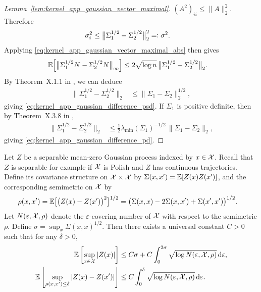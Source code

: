 \begin{proof}[Lemma~\ref{lem:kernel_app_gaussian_vector_maximal}]
  $(A^2)_{ii} \leq \|A\|_2^2$.
  Therefore
  \begin{align*}
    \sigma_i^2
    &\leq
    \big\|
    \Sigma_1^{1/2} - \Sigma_2^{1/2}
    \big\|_2^2
    =\vcentcolon
    \sigma^2.
  \end{align*}
  Applying
  \eqref{eq:kernel_app_gaussian_vector_maximal_abs}
  then gives
  \begin{align*}
    \mathbb{E}\Big[
      \big\|
      \Sigma_1^{1/2} N
      - \Sigma_2^{1/2} N
      \big\|_\infty
    \Big]
    &\leq
    2 \sqrt{\log n} \,
    \big\|
    \Sigma_1^{1/2} - \Sigma_2^{1/2}
    \big\|_2.
  \end{align*}
  By Theorem~X.1.1
  in \citet{bhatia1997matrix},
  we can deduce
  \begin{align*}
    \big\|
    \Sigma_1^{1/2} - \Sigma_2^{1/2}
    \big\|_2
    &\leq
    \big\|
    \Sigma_1 - \Sigma_2
    \big\|_2^{1/2},
  \end{align*}
  giving
  \eqref{eq:kernel_app_gaussian_difference_psd}.
  If $\Sigma_1$
  is positive definite,
  then by
  Theorem~X.3.8 in
  \citet{bhatia1997matrix},
  \begin{align*}
    \big\|
    \Sigma_1^{1/2} - \Sigma_2^{1/2}
    \big\|_2
    &\leq
    \frac{1}{2}
    \lambda_{\min}(\Sigma_1)^{-1/2} \,
    \big\|
    \Sigma_1 - \Sigma_2
    \big\|_2,
  \end{align*}
  giving
  \eqref{eq:kernel_app_gaussian_difference_pd}.
\end{proof}

\begin{lemma}
  \label{lem:kernel_app_gaussian_process_maximal}

  Let $Z$ be a separable
  mean-zero Gaussian process indexed
  by $x \in \mathcal{X}$.
  Recall that $Z$ is separable for example if
  $\mathcal{X}$ is Polish and $Z$ has
  continuous trajectories.
  Define its covariance structure on $\mathcal{X} \times \mathcal{X}$
  by $\Sigma(x, x') = \mathbb{E}[Z(x) Z(x')]$,
  and the corresponding semimetric on $\mathcal{X}$ by
  \begin{align*}
    \rho(x,x')
    &=
    \mathbb{E}\big[\big(Z(x) - Z(x')\big)^2\big]^{1/2}
    = \big(\Sigma(x,x)
      - 2 \Sigma(x,x')
    + \Sigma(x',x')\big)^{1/2}.
  \end{align*}
  Let $N(\varepsilon, \mathcal{X}, \rho)$
  denote the $\varepsilon$-covering number of $\mathcal{X}$
  with respect to the semimetric $\rho$.
  Define $\sigma = \sup_x \Sigma(x,x)^{1/2}$.
  Then there exists a universal constant $C > 0$
  such that for any $\delta > 0$,
  \begin{align*}
    \mathbb{E}\left[
      \sup_{x \in \mathcal{X}}
      |Z(x)|
    \right]
    &\leq
    C \sigma
    + C \int_0^{2\sigma}
    \sqrt{\log N(\varepsilon, \mathcal{X}, \rho)}
    \,\mathrm{d}\varepsilon, \\
    \mathbb{E}\left[
      \sup_{\rho(x,x') \leq \delta}
      |Z(x) - Z(x')|
    \right]
    &\leq
    C \int_0^{\delta}
    \sqrt{\log N(\varepsilon, \mathcal{X}, \rho)}
    \,\mathrm{d}\varepsilon.
  \end{align*}

\end{lemma}

